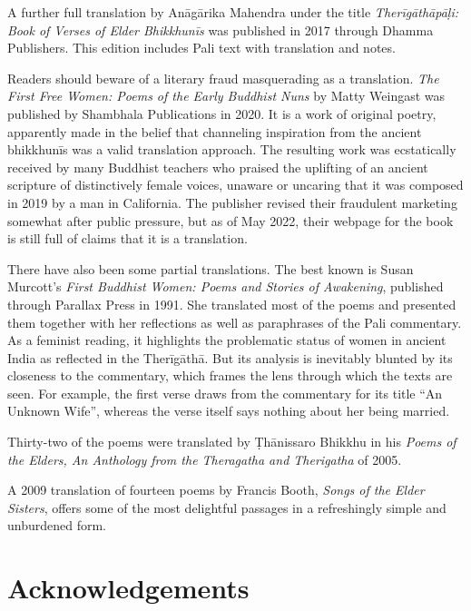 \documentclass[12pt,openany]{book}%
\begin{document}
A further full translation by \textsanskrit{Anāgārika} Mahendra under the title \textit{\textsanskrit{Therīgāthāpāḷi}: Book of Verses of Elder \textsanskrit{Bhikkhunīs}} was published in 2017 through Dhamma Publishers. This edition includes Pali text with translation and notes.

Readers should beware of a literary fraud masquerading as a translation. \textit{The First Free Women: Poems of the Early Buddhist Nuns} by Matty Weingast was published by Shambhala Publications in 2020. It is a work of original poetry, apparently made in the belief that channeling inspiration from the ancient \textsanskrit{bhikkhunīs} was a valid translation approach. The resulting work was ecstatically received by many Buddhist teachers who praised the uplifting of an ancient scripture of distinctively female voices, unaware or uncaring that it was composed in 2019 by a man in California. The publisher revised their fraudulent marketing somewhat after public pressure, but as of May 2022, their webpage for the book is still full of claims that it is a translation.

There have also been some partial translations. The best known is Susan Murcott’s \textit{First Buddhist Women: Poems and Stories of Awakening}, published through Parallax Press in 1991. She translated most of the poems and presented them together with her reflections as well as paraphrases of the Pali commentary. As a feminist reading, it highlights the problematic status of women in ancient India as reflected in the \textsanskrit{Therīgāthā}. But its analysis is inevitably blunted by its closeness to the commentary, which frames the lens through which the texts are seen. For example, the first verse draws from the commentary for its title “An Unknown Wife”, whereas the verse itself says nothing about her being married.

Thirty-two of the poems were translated by \textsanskrit{Ṭhānissaro} Bhikkhu in his \textit{Poems of the Elders, An Anthology from the Theragatha and Therigatha} of 2005.

A 2009 translation of fourteen poems by Francis Booth, \textit{Songs of the Elder Sisters}, offers some of the most delightful passages in a refreshingly simple and unburdened form.

%
\chapter*{Acknowledgements}
\end{document}
